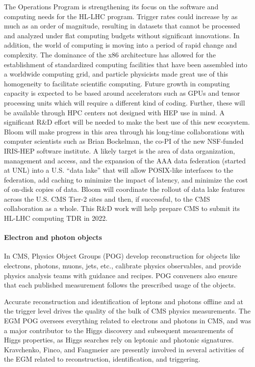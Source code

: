 The Operations Program is strengthening its focus on the software and computing needs for the HL-LHC program.  Trigger rates could increase by as much as an order of magnitude, resulting in datasets that cannot be processed and analyzed under flat computing budgets without significant innovations.  In addition, the world of computing is moving into a period of rapid change and complexity.  The dominance of the x86 architecture has allowed for the establishment of standardized computing facilities that have been assembled into a worldwide computing grid, and particle physicists made great use of this homogeneity to facilitate scientific computing.  Future growth in computing capacity is expected to be based around accelerators such as GPUs and tensor processing units which will require a different kind of coding.  Further, these will be available through HPC centers  not designed with HEP use in mind.  A significant R\&D effort will be needed to make the best use of this new ecosystem.  Bloom will make progress in this area through his long-time collaborations with computer scientists such as Brian Bockelman, the co-PI of the new NSF-funded IRIS-HEP software institute.  A likely target is the area of data organization, management and access, and the expansion of the AAA data federation (started at UNL) into a U.S. ``data lake'' that will allow POSIX-like interfaces to the federation, add caching to minimize the impact of latency, and minimize the cost of on-disk copies of data.  Bloom will coordinate the rollout of data lake features across the U.S. CMS Tier-2 sites and then, if successful, to the CMS collaboration as a whole.  This R\&D work will help prepare CMS to submit its HL-LHC computing TDR in 2022.

\paragraph{Electron and photon objects}
In CMS, Physics Object Groups (POG) develop reconstruction for objects like electrons, photons, muons, jets, etc.,
%
calibrate physics observables, and provide  physics analysis teams  with guidance and recipes. POG conveners also ensure that each published measurement follows the prescribed usage of the objects. 

Accurate reconstruction and identification of leptons and photons offline and at the trigger level drives the quality of the bulk of CMS physics measurements. 
The EGM POG oversees everything related to electrons and photons in CMS, and was a major contributor to the Higgs discovery and subsequent measurements of Higgs properties, as Higgs searches rely on leptonic and photonic signatures. Kravchenko, Finco, and Fangmeier are presently involved in several activities of the EGM related to reconstruction, identification, and triggering.

